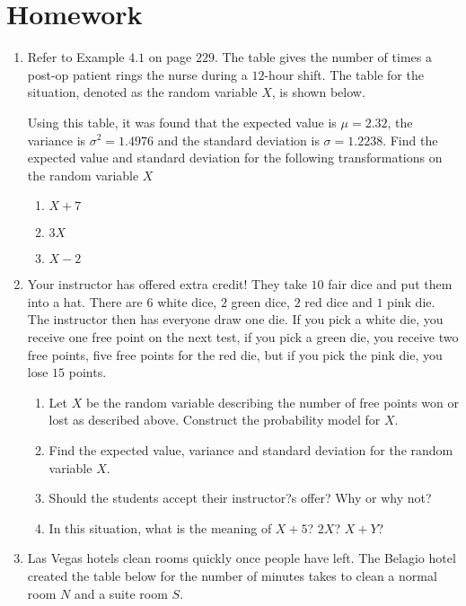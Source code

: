 
\section{Homework}

\begin{enumerate}
\item  Refer to Example \(4.1\) on page \(229\). The table gives the number of times a post-op patient rings the nurse during a \(12\)-hour shift. The table for the situation, denoted as the random variable \(X\), is shown below.

Using this table, it was found that the expected value is \(\mu=2.32\), the variance is \(\sigma^2=1.4976\) and the standard deviation is \(\sigma=1.2238\). Find the expected value and standard deviation for the following transformations on the random variable \(X\)
\begin{enumerate}
\item \(X+7\)			
\item \(3X\)				
\item \(X-2\) 
\end{enumerate}

\item  Your instructor has offered extra credit! They take \(10\) fair dice and put them into a hat. There are \(6\) white dice, \(2\) green dice, \(2\) red dice and \(1\) pink die. The instructor then has everyone draw one die. If you pick a white die, you receive one free point on the next test, if you pick a green die, you receive two free points, five free points for the red die, but if you pick the pink die, you lose \(15\) points.

\begin{enumerate}
\item  Let \(X\) be the random variable describing the number of free points won or lost as described above. Construct the probability model for \(X\).
\item  Find the expected value, variance and standard deviation for the random variable \(X\).
\item  Should the students accept their instructor?s offer? Why or why not?
\item  In this situation, what is the meaning of \(X+5\)? \(2X\)? \(X+Y\)?
\end{enumerate}

\item  Las Vegas hotels clean rooms quickly once people have left. The Belagio hotel created the table below for the number of minutes takes to clean a normal room \(N\) and a suite room \(S\).


\end{enumerate}
